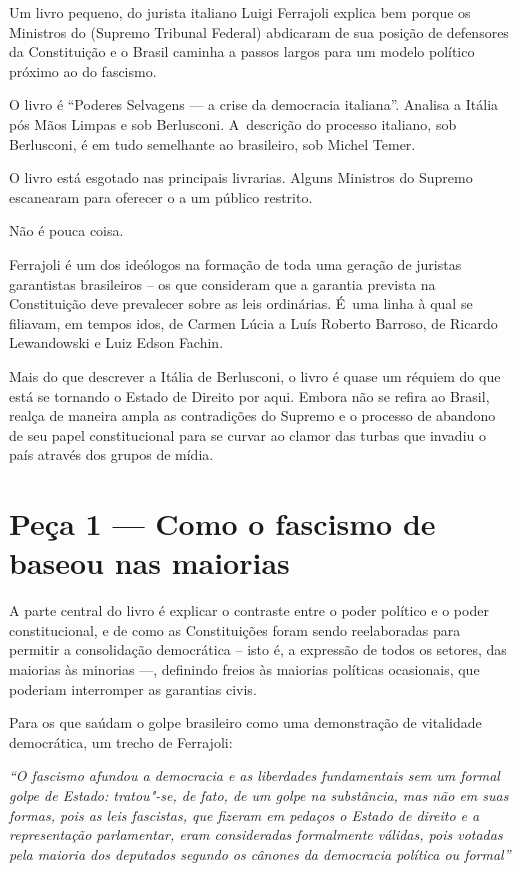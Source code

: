  

Um livro pequeno, do jurista italiano Luigi Ferrajoli explica bem porque
os Ministros do  (Supremo Tribunal Federal) abdicaram de sua posição
de defensores da Constituição e o Brasil caminha a passos largos para um
modelo político próximo ao do fascismo.

O livro é ``Poderes Selvagens --- a crise da democracia italiana''.
Analisa a Itália pós Mãos Limpas e sob Berlusconi. A~descrição do
processo italiano, sob Berlusconi, é em tudo semelhante ao brasileiro,
sob Michel Temer.

O livro está esgotado nas principais livrarias. Alguns Ministros do
Supremo escanearam para oferecer o  a um público restrito.

Não é pouca coisa.

Ferrajoli é um dos ideólogos na formação de toda uma geração de juristas
garantistas brasileiros -- os que consideram que a garantia prevista na
Constituição deve prevalecer sobre as leis ordinárias. É~uma linha à
qual se filiavam, em tempos idos, de Carmen Lúcia a Luís Roberto
Barroso, de Ricardo Lewandowski e Luiz Edson Fachin.~

Mais do que descrever a Itália de Berlusconi, o livro é quase um réquiem
do que está se tornando o Estado de Direito por aqui. Embora não se
refira ao Brasil, realça de maneira ampla as contradições do Supremo e o
processo de abandono de seu papel constitucional para se curvar ao
clamor das turbas que invadiu o país através dos grupos de mídia.

\section{Peça 1 --- Como o fascismo de baseou nas maiorias}

A parte central do livro é explicar o contraste entre o poder político e
o poder constitucional, e de como as Constituições foram sendo
reelaboradas para permitir a consolidação democrática -- isto é, a
expressão de todos os setores, das maiorias às minorias \mbox{---,} definindo
freios às maiorias políticas ocasionais, que poderiam interromper as
garantias civis.

Para os que saúdam o golpe brasileiro como uma demonstração de
vitalidade democrática, um trecho de Ferrajoli:

\emph{``O fascismo afundou a democracia e as liberdades fundamentais sem
um formal golpe de Estado: tratou"-se, de fato, de um golpe na
substância, mas não em suas formas, pois as leis fascistas, que fizeram
em pedaços o Estado de direito e a representação parlamentar, eram
consideradas formalmente válidas, pois votadas pela maioria dos
deputados segundo os cânones da democracia política ou formal''}

